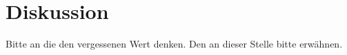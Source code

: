 \newpage
\section{Diskussion}
\label{sec:Diskussion}

Bitte an die den vergessenen Wert denken. Den an dieser Stelle bitte erwähnen.